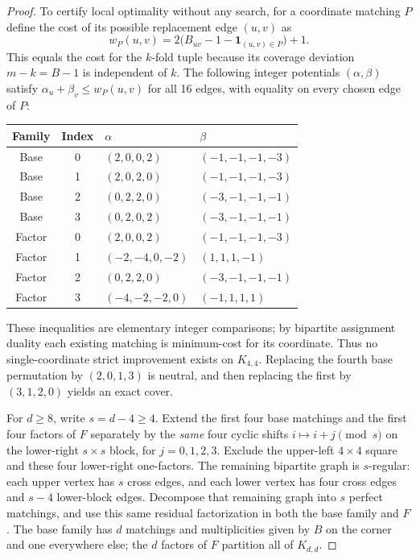 \documentclass[10pt]{article}
\begin{document}
\begin{proof}
To certify local optimality without any search, for a coordinate matching $P$ define the cost of its possible replacement edge $(u,v)$ as
\[w_P(u,v)=2\bigl(B_{uv}-1-\mathbf1_{(u,v)\in P}\bigr)+1.\]
This equals the cost for the $k$-fold tuple because its coverage deviation $m-k=B-1$ is independent of $k$. The following integer potentials $(\alpha,\beta)$ satisfy $\alpha_u+\beta_v\le w_P(u,v)$ for all 16 edges, with equality on every chosen edge of $P$:
\begin{center}\small
\begin{tabular}{ccll}\toprule
Family & Index & $\alpha$ & $\beta$\\\midrule
Base & 0 & $(2,0,0,2)$ & $(-1,-1,-1,-3)$\\
Base & 1 & $(2,0,2,0)$ & $(-1,-1,-1,-3)$\\
Base & 2 & $(0,2,2,0)$ & $(-3,-1,-1,-1)$\\
Base & 3 & $(0,2,0,2)$ & $(-3,-1,-1,-1)$\\\midrule
Factor & 0 & $(2,0,0,2)$ & $(-1,-1,-1,-3)$\\
Factor & 1 & $(-2,-4,0,-2)$ & $(1,1,1,-1)$\\
Factor & 2 & $(0,2,2,0)$ & $(-3,-1,-1,-1)$\\
Factor & 3 & $(-4,-2,-2,0)$ & $(-1,1,1,1)$\\\bottomrule
\end{tabular}
\end{center}
These inequalities are elementary integer comparisons; by bipartite assignment duality each existing matching is minimum-cost for its coordinate. Thus no single-coordinate strict improvement exists on $K_{4,4}$. Replacing the fourth base permutation by $(2,0,1,3)$ is neutral, and then replacing the first by $(3,1,2,0)$ yields an exact cover.

For $d\ge8$, write $s=d-4\ge4$. Extend the first four base matchings and the first four factors of $F$ separately by the \emph{same} four cyclic shifts $i\mapsto i+j\pmod s$ on the lower-right $s\times s$ block, for $j=0,1,2,3$. Exclude the upper-left $4\times4$ square and these four lower-right one-factors. The remaining bipartite graph is $s$-regular: each upper vertex has $s$ cross edges, and each lower vertex has four cross edges and $s-4$ lower-block edges. Decompose that remaining graph into $s$ perfect matchings, and use this same residual factorization in both the base family and $F$. The base family has $d$ matchings and multiplicities given by $B$ on the corner and one everywhere else; the $d$ factors of $F$ partition all of $K_{d,d}$.


\end{proof}
\end{document}
